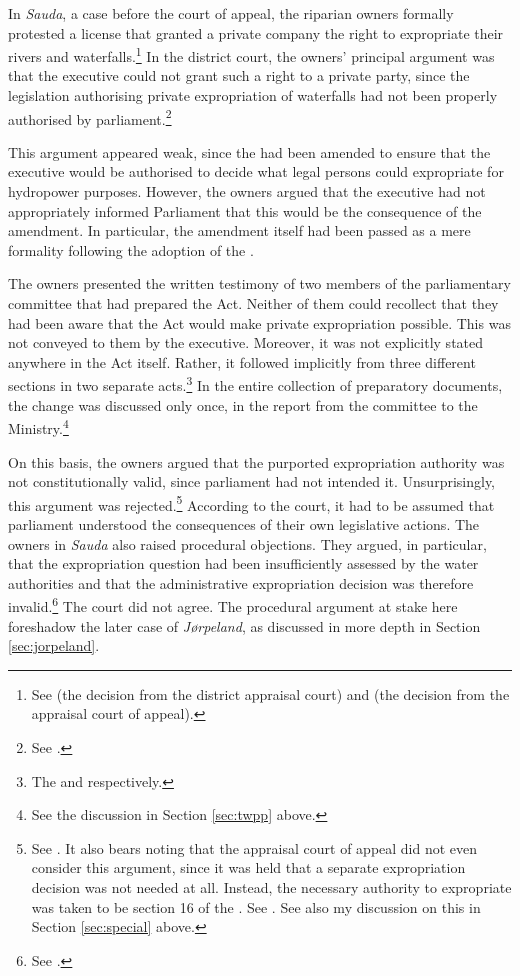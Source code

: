 In {\it Sauda}, a case before the court of appeal, the riparian owners formally protested a license that granted a private company the right to expropriate their rivers and waterfalls.\footnote{See \cite{sauda07} (the decision from the district appraisal court) and \cite{sauda09} (the decision from the appraisal court of appeal).} In the district court, the owners' principal argument was that the executive could not grant such a right to a private party, since the legislation authorising private expropriation of waterfalls had not been properly authorised by parliament.\footnote{See \cite{sauda07}.}

This argument appeared weak, since the \cite{ea59} had been amended to ensure that the executive would be authorised to decide what legal persons could expropriate for hydropower purposes. However, the owners argued that the executive had not appropriately informed Parliament that this would be the consequence of the amendment. In particular, the amendment itself had been passed as a mere formality following the adoption of the \cite{wra00}. 

The owners presented the written testimony of two members of the parliamentary committee that had prepared the Act. Neither of them could recollect that they had been aware that the Act would make private expropriation possible. This was not conveyed to them by the executive. Moreover, it was not explicitly stated anywhere in the Act itself. Rather, it followed implicitly from three different sections in two separate acts.\footnote{The \cite[51]{wra00} and \cite[2][3]{ea59} respectively.} In the entire collection of preparatory documents, the change was discussed only once, in the report from the committee to the Ministry.\footnote{See the discussion in Section \ref{sec:twpp} above.}

On this basis, the owners argued that the purported expropriation authority was not constitutionally valid, since parliament had not intended it. Unsurprisingly, this argument was rejected.\footnote{See \cite{sauda07}. It also bears noting that the appraisal court of appeal did not even consider this argument, since it was held that a separate expropriation decision was not needed at all. Instead, the necessary authority to expropriate was taken to be section 16 of the \cite{wra17}. See \cite{sauda09}. See also my discussion on this in Section \ref{sec:special} above.} According to the court, it had to be assumed that parliament understood the consequences of their own legislative actions. The owners in {\it Sauda} also raised procedural objections. They argued, in particular, that the expropriation question had been insufficiently assessed by the water authorities and that the administrative expropriation decision was therefore invalid.\footnote{See \cite{sauda09}.} The court did not agree. The procedural argument at stake here foreshadow the later case of {\it Jørpeland}, as discussed in more depth in Section \ref{sec:jorpeland}.

